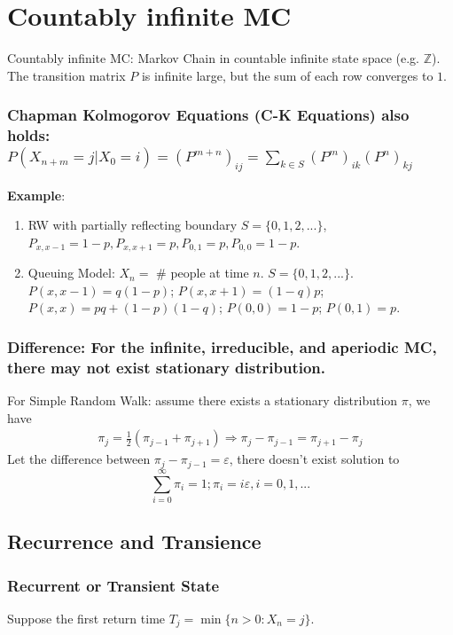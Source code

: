 \documentclass[11pt]{elegantbook}
\begin{document}
\chapter{ Countably infinite MC}
Countably infinite MC: Markov Chain in countable infinite state space (e.g. $\mathbb{Z}$). The transition matrix $P$ is infinite large, but the sum of each row converges to $1$.
\subsection*{ Chapman Kolmogorov Equations (C-K Equations) also holds: $P(X_{n+m}=j|X_0=i)=(P^{m+n})_{ij}=\sum_{k\in S}(P^{m})_{ik}(P^{n})_{kj}$}
\textbf{Example}:
\begin{enumerate}[(1)]
    \item RW with partially reflecting boundary $S=\{0,1,2,...\}$, $P_{x,x-1}=1-p,P_{x,x+1}=p, P_{0,1}=p, P_{0,0}=1-p$.
    \item Queuing Model: $X_n=$ \# people at time $n$. $S=\{0,1,2,...\}$. $P(x,x-1)=q(1-p)$; $P(x,x+1)=(1-q)p$; $P(x,x)=pq+(1-p)(1-q)$; $P(0,0)=1-p$; $P(0,1)=p$.
\end{enumerate}

\subsection*{Difference: For the infinite, irreducible, and aperiodic MC, there may not exist stationary distribution.}
\begin{example}
    For Simple Random Walk: assume there exists a stationary distribution $\pi$, we have
    \begin{equation}
        \begin{aligned}
            \pi_j=\frac{1}{2}(\pi_{j-1}+\pi_{j+1}) \Rightarrow \pi_j-\pi_{j-1}=\pi_{j+1}-\pi_j
        \end{aligned}
        \nonumber
    \end{equation}
    Let the difference between $\pi_j-\pi_{j-1}=\varepsilon$, there doesn't exist solution to
    $$\sum_{i=0}^\infty \pi_i=1; \pi_i=i \varepsilon, i=0,1,...$$
\end{example}

\section{Recurrence and Transience}

\subsection{Recurrent or Transient State}
Suppose the first return time $T_j=\min\{n>0:X_n=j\}$.
\end{document}

